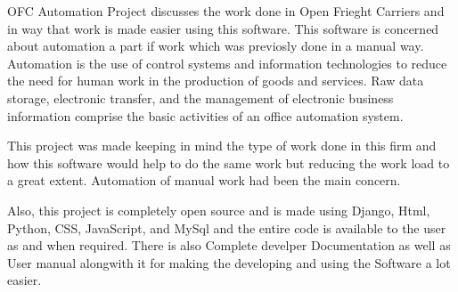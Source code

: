 \begin{Large}
\end{Large}
OFC Automation Project discusses the work done in Open Frieght Carriers
and in way that work is made easier using this software. This software 
is concerned about automation a part if work which was previosly done 
in a manual way. Automation is the use of control systems and 
information technologies to reduce the need for human work in the 
production of goods and services. Raw data storage, electronic transfer, 
and the management of electronic business information comprise the basic 
activities of an office automation system.

This project was made keeping in mind the type of work done in this firm 
and how this software would help to do the same work but reducing the 
work load to a great extent. Automation of manual work had been the 
main concern.

Also, this project is completely open source and is made using Django,
Html, Python, CSS, JavaScript, and MySql and the entire code is available 
to the user as and when required. There is also Complete develper 
Documentation as well as User manual alongwith it for making the 
developing and using the Software a lot easier.
